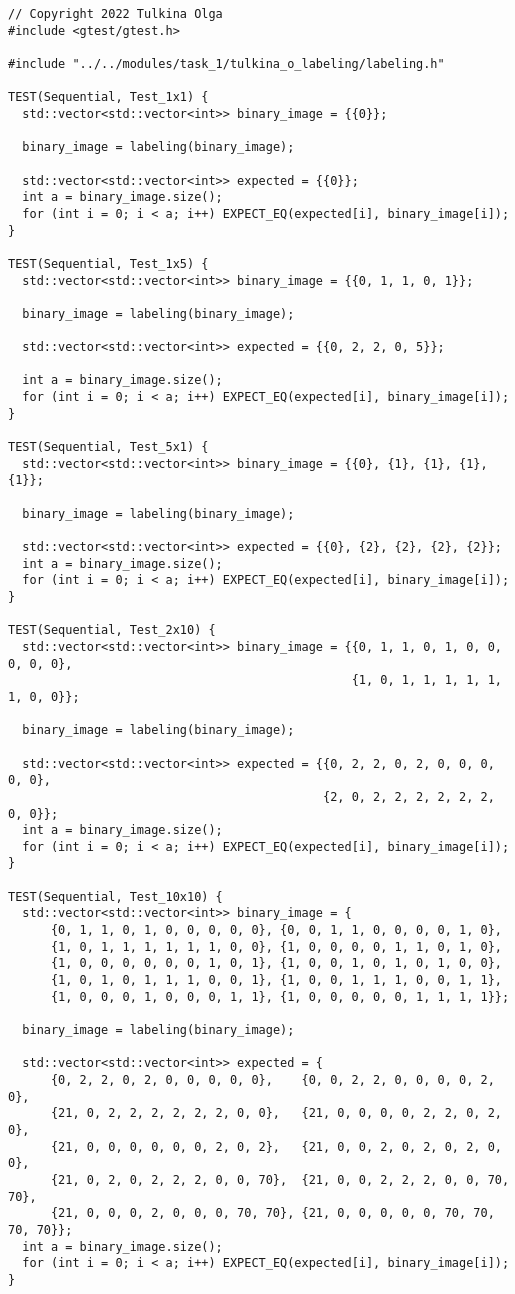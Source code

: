 \documentclass[12pt]{article}
\begin{document}
\begin{lstlisting}
// Copyright 2022 Tulkina Olga
#include <gtest/gtest.h>

#include "../../modules/task_1/tulkina_o_labeling/labeling.h"

TEST(Sequential, Test_1x1) {
  std::vector<std::vector<int>> binary_image = {{0}};

  binary_image = labeling(binary_image);

  std::vector<std::vector<int>> expected = {{0}};
  int a = binary_image.size();
  for (int i = 0; i < a; i++) EXPECT_EQ(expected[i], binary_image[i]);
}

TEST(Sequential, Test_1x5) {
  std::vector<std::vector<int>> binary_image = {{0, 1, 1, 0, 1}};

  binary_image = labeling(binary_image);

  std::vector<std::vector<int>> expected = {{0, 2, 2, 0, 5}};

  int a = binary_image.size();
  for (int i = 0; i < a; i++) EXPECT_EQ(expected[i], binary_image[i]);
}

TEST(Sequential, Test_5x1) {
  std::vector<std::vector<int>> binary_image = {{0}, {1}, {1}, {1}, {1}};

  binary_image = labeling(binary_image);

  std::vector<std::vector<int>> expected = {{0}, {2}, {2}, {2}, {2}};
  int a = binary_image.size();
  for (int i = 0; i < a; i++) EXPECT_EQ(expected[i], binary_image[i]);
}

TEST(Sequential, Test_2x10) {
  std::vector<std::vector<int>> binary_image = {{0, 1, 1, 0, 1, 0, 0, 0, 0, 0},
                                                {1, 0, 1, 1, 1, 1, 1, 1, 0, 0}};

  binary_image = labeling(binary_image);

  std::vector<std::vector<int>> expected = {{0, 2, 2, 0, 2, 0, 0, 0, 0, 0},
                                            {2, 0, 2, 2, 2, 2, 2, 2, 0, 0}};
  int a = binary_image.size();
  for (int i = 0; i < a; i++) EXPECT_EQ(expected[i], binary_image[i]);
}

TEST(Sequential, Test_10x10) {
  std::vector<std::vector<int>> binary_image = {
      {0, 1, 1, 0, 1, 0, 0, 0, 0, 0}, {0, 0, 1, 1, 0, 0, 0, 0, 1, 0},
      {1, 0, 1, 1, 1, 1, 1, 1, 0, 0}, {1, 0, 0, 0, 0, 1, 1, 0, 1, 0},
      {1, 0, 0, 0, 0, 0, 0, 1, 0, 1}, {1, 0, 0, 1, 0, 1, 0, 1, 0, 0},
      {1, 0, 1, 0, 1, 1, 1, 0, 0, 1}, {1, 0, 0, 1, 1, 1, 0, 0, 1, 1},
      {1, 0, 0, 0, 1, 0, 0, 0, 1, 1}, {1, 0, 0, 0, 0, 0, 1, 1, 1, 1}};

  binary_image = labeling(binary_image);

  std::vector<std::vector<int>> expected = {
      {0, 2, 2, 0, 2, 0, 0, 0, 0, 0},    {0, 0, 2, 2, 0, 0, 0, 0, 2, 0},
      {21, 0, 2, 2, 2, 2, 2, 2, 0, 0},   {21, 0, 0, 0, 0, 2, 2, 0, 2, 0},
      {21, 0, 0, 0, 0, 0, 0, 2, 0, 2},   {21, 0, 0, 2, 0, 2, 0, 2, 0, 0},
      {21, 0, 2, 0, 2, 2, 2, 0, 0, 70},  {21, 0, 0, 2, 2, 2, 0, 0, 70, 70},
      {21, 0, 0, 0, 2, 0, 0, 0, 70, 70}, {21, 0, 0, 0, 0, 0, 70, 70, 70, 70}};
  int a = binary_image.size();
  for (int i = 0; i < a; i++) EXPECT_EQ(expected[i], binary_image[i]);
}
\end{lstlisting}
\end{document}
